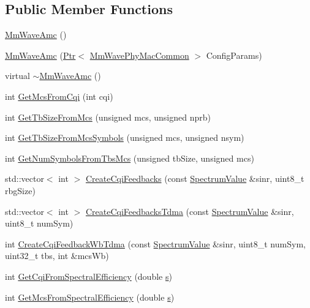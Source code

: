\subsection*{Public Member Functions}
\begin{DoxyCompactItemize}
\item 
\hyperlink{classns3_1_1MmWaveAmc_a1105c5129f396868fcf506be557ef3fe}{Mm\+Wave\+Amc} ()
\item 
\hyperlink{classns3_1_1MmWaveAmc_a72e60b8bf0ce89643dd7ec124618b43d}{Mm\+Wave\+Amc} (\hyperlink{classns3_1_1Ptr}{Ptr}$<$ \hyperlink{classns3_1_1MmWavePhyMacCommon}{Mm\+Wave\+Phy\+Mac\+Common} $>$ Config\+Params)
\item 
virtual \hyperlink{classns3_1_1MmWaveAmc_ab79b401e8c54cc5b8f96b627f76876ae}{$\sim$\+Mm\+Wave\+Amc} ()
\item 
int \hyperlink{classns3_1_1MmWaveAmc_a5137f0072cc2ffa24e92dbad1d13311c}{Get\+Mcs\+From\+Cqi} (int cqi)
\item 
int \hyperlink{classns3_1_1MmWaveAmc_a46a70ae19f81f7b1f9307100caabc0e8}{Get\+Tb\+Size\+From\+Mcs} (unsigned mcs, unsigned nprb)
\item 
int \hyperlink{classns3_1_1MmWaveAmc_a7e972b1d61df4f0236301ecb24f13447}{Get\+Tb\+Size\+From\+Mcs\+Symbols} (unsigned mcs, unsigned nsym)
\item 
int \hyperlink{classns3_1_1MmWaveAmc_a652580bea28d3e58e039dcc5667afccf}{Get\+Num\+Symbols\+From\+Tbs\+Mcs} (unsigned tb\+Size, unsigned mcs)
\item 
std\+::vector$<$ int $>$ \hyperlink{classns3_1_1MmWaveAmc_a673c746802068cda65762a6a78f41404}{Create\+Cqi\+Feedbacks} (const \hyperlink{classns3_1_1SpectrumValue}{Spectrum\+Value} \&sinr, uint8\+\_\+t rbg\+Size)
\item 
std\+::vector$<$ int $>$ \hyperlink{classns3_1_1MmWaveAmc_a82460d4003c51ac63ecfe23a3c8bbaec}{Create\+Cqi\+Feedbacks\+Tdma} (const \hyperlink{classns3_1_1SpectrumValue}{Spectrum\+Value} \&sinr, uint8\+\_\+t num\+Sym)
\item 
int \hyperlink{classns3_1_1MmWaveAmc_a692293fdeba014cbaa8e316bd12a6fd0}{Create\+Cqi\+Feedback\+Wb\+Tdma} (const \hyperlink{classns3_1_1SpectrumValue}{Spectrum\+Value} \&sinr, uint8\+\_\+t num\+Sym, uint32\+\_\+t tbs, int \&mcs\+Wb)
\item 
int \hyperlink{classns3_1_1MmWaveAmc_acbe2e5714d389d77b25d1dfbe433a806}{Get\+Cqi\+From\+Spectral\+Efficiency} (double \hyperlink{generate__test__data__lte__sinr_8m_ad83eeb3a142285d1243a08c6b7026df8}{s})
\item 
int \hyperlink{classns3_1_1MmWaveAmc_a3632ed497ab17df876e281a823f0450c}{Get\+Mcs\+From\+Spectral\+Efficiency} (double \hyperlink{generate__test__data__lte__sinr_8m_ad83eeb3a142285d1243a08c6b7026df8}{s})
\end{DoxyCompactItemize}
